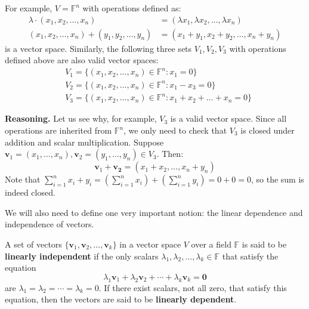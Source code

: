 \documentclass[../lecture-notes-148x210.tex]{subfiles}
\begin{document}
\begin{example}
    For example, $V = \mathbb{F}^n$ with operations defined as:
    \begin{equation*}
        \begin{aligned}
            \lambda \cdot (x_1,x_2,\dots,x_n) &= (\lambda x_1, \lambda x_2, \dots, \lambda x_n) \\
            (x_1,x_2,\dots,x_n) + (y_1,y_2,\dots,y_n) &= (x_1+y_1, x_2+y_2, \dots, x_n+y_n)
        \end{aligned}
    \end{equation*}
    is a vector space. Similarly, the following three sets $V_1,V_2,V_3$ with operations defined above are also valid vector spaces:
    \begin{equation*}
        \begin{aligned}
            &V_1 = \{(x_1,x_2,\dots,x_n) \in \mathbb{F}^n: x_1 = 0\} \\
            &V_2 = \{(x_1,x_2,\dots,x_n) \in \mathbb{F}^n: x_1-x_3 = 0\} \\
            &V_3 = \{(x_1,x_2,\dots,x_n) \in \mathbb{F}^n: x_1+x_2+\dots+x_n = 0\}
        \end{aligned}
    \end{equation*}

    \textbf{Reasoning.} Let us see why, for example, $V_3$ is a valid vector space. Since all operations 
    are inherited from $\mathbb{F}^n$, we only need to check that $V_3$ is closed under addition and scalar multiplication.
    Suppose $\mathbf{v}_1=(x_1,\dots,x_n),\mathbf{v}_2=(y_1,\dots,y_n) \in V_3$. Then:
    \begin{equation*}
        \mathbf{v}_1 + \mathbf{v_2} = (x_1+x_2,\dots,x_n+y_n)
    \end{equation*}
    Note that $\sum_{i=1}^n x_i+y_i = \left(\sum_{i=1}^n x_i\right) + \left(\sum_{i=1}^ny_i\right) = 0 + 0 = 0$, so the sum is indeed closed.
\end{example}

We will also need to define one very important notion: the linear dependence and independence of vectors.

\begin{definition}
    A set of vectors $\{\mathbf{v}_1, \mathbf{v}_2, \dots, \mathbf{v}_k\}$ in a vector space $V$ over a field $\mathbb{F}$ is said to be \textbf{linearly independent} if the only scalars $\lambda_1, \lambda_2, \dots, \lambda_k \in \mathbb{F}$ that satisfy the equation
    \begin{equation*}
        \lambda_1 \mathbf{v}_1 + \lambda_2 \mathbf{v}_2 + \cdots + \lambda_k \mathbf{v}_k = \mathbf{0}
    \end{equation*}
    are $\lambda_1 = \lambda_2 = \cdots = \lambda_k = 0$. If there exist scalars, not all zero, that satisfy this equation, then the vectors are said to be \textbf{linearly dependent}.
\end{definition}
\end{document}
